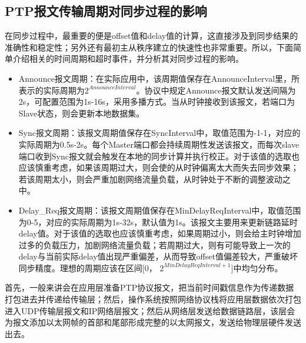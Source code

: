 \subsection{PTP报文传输周期对同步过程的影响}
在同步过程中，最重要的便是offset值和delay值的计算，这直接涉及到同步结果的准确性和稳定性；另外还有最初主从秩序建立的快速性也非常重要。所以，下面简单介绍相关的时间周期和超时事件，并分析其对同步过程的影响。
\begin{itemize}[noitemsep,topsep=0pt,parsep=0pt,partopsep=0pt]
	\item Announce报文周期：在实际应用中，该周期值保存在AnnounceInterval里，所表示的实际周期为$2^{AnnounceInterval}$。协议中规定Announce报文默认发送间隔为2s，可配置范围为1s-16s，采用多播方式。当从时钟接收到该报文，若端口为Slave状态，则会更新本地数据集。
	\item Sync报文周期：该报文周期值保存在SyncInterval中，取值范围为-1-1，对应的实际周期为0.5s-2s。每个Master端口都会持续周期性发送该报文，而每次slave端口收到Sync报文就会触发在本地的同步计算并执行校正。对于该值的选取也应该慎重考虑，如果该周期过大，则会使的从时钟偏离太大而失去同步效果；若该周期太小，则会严重加剧网络流量负载，从时钟处于不断的调整波动之中。
	\item Delay\_Req报文周期：该报文周期值保存在MinDelayReqInterval中，取值范围为0-5，对应的实际周期为1s-32s，默认值为1s。该报文主要用来更新链路延时delay值。对于该值的选取也应该慎重考虑，如果周期过小，则会给主时钟增加过多的负载压力，加剧网络流量负载；若周期过大，则有可能导致上一次的delay与当前实际delay值出现严重偏差，从而导致offset值偏差较大，严重破坏同步精度。理想的周期应该在区间[0， $2^{MinDelayReqInterval+1}$]中均匀分布。
\end{itemize}

首先，一般来讲会在应用层准备PTP协议报文，把当前时间戳信息作为传递数据打包进去并传递给传输层；然后，操作系统按照网络协议栈将应用层数据依次打包进入UDP传输层报文和IP网络层报文；然后从网络层发送给数据链路层，该层会为报文添加以太网帧的首部和尾部形成完整的以太网报文，发送给物理层硬件发送出去\supercite{54}。



